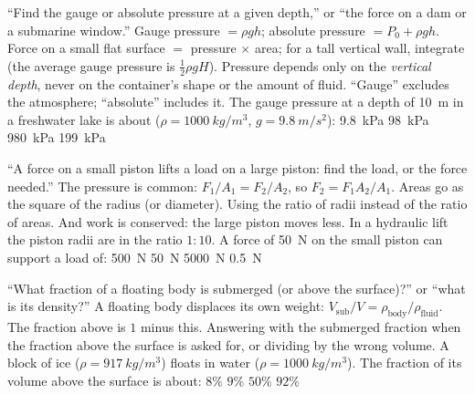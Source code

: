 {``Find the gauge or absolute pressure at a given depth,'' or ``the force on a dam or a submarine
window.''}
{Gauge pressure $=\rho gh$; absolute pressure $=P_0+\rho gh$. Force on a small flat surface $=$ pressure
$\times$ area; for a tall vertical wall, integrate (the average gauge pressure is $\tfrac12\rho gH$).}
{Pressure depends only on the \emph{vertical depth}, never on the container's shape or the amount of fluid.
``Gauge'' excludes the atmosphere; ``absolute'' includes it.}
{The gauge pressure at a depth of \SI{10}{m} in a freshwater lake is about ($\rho=\SI{1000}{kg/m^3}$,
$g=\SI{9.8}{m/s^2}$):}
{\SI{9.8}{kPa}}
{\SI{98}{kPa}}
{\SI{980}{kPa}}
{\SI{199}{kPa}}

{``A force on a small piston lifts a load on a large piston: find the load, or the force needed.''}
{The pressure is common: $F_1/A_1=F_2/A_2$, so $F_2=F_1A_2/A_1$. Areas go as the square of the radius (or
diameter).}
{Using the ratio of radii instead of the ratio of areas. And work is conserved: the large piston moves
less.}
{In a hydraulic lift the piston radii are in the ratio $1:10$. A force of \SI{50}{N} on the small piston can
support a load of:}
{\SI{500}{N}}
{\SI{50}{N}}
{\SI{5000}{N}}
{\SI{0.5}{N}}

{``What fraction of a floating body is submerged (or above the surface)?'' or ``what is its density?''}
{A floating body displaces its own weight: $V_{\text{sub}}/V=\rho_{\text{body}}/\rho_{\text{fluid}}$. The
fraction above is $1$ minus this.}
{Answering with the submerged fraction when the fraction above the surface is asked for, or dividing by the
wrong volume.}
{A block of ice ($\rho=\SI{917}{kg/m^3}$) floats in water ($\rho=\SI{1000}{kg/m^3}$). The fraction of its
volume above the surface is about:}
{$8\%$}
{$9\%$}
{$50\%$}
{$92\%$}

